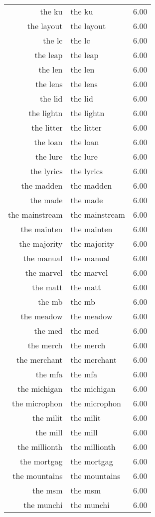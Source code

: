 \begin{table}[ht]
\begin{tabular}{rlr}
  the ku & the ku & 6.00 \\ 
  the layout & the layout & 6.00 \\ 
  the lc & the lc & 6.00 \\ 
  the leap & the leap & 6.00 \\ 
  the len & the len & 6.00 \\ 
  the lens & the lens & 6.00 \\ 
  the lid & the lid & 6.00 \\ 
  the lightn & the lightn & 6.00 \\ 
  the litter & the litter & 6.00 \\ 
  the loan & the loan & 6.00 \\ 
  the lure & the lure & 6.00 \\ 
  the lyrics & the lyrics & 6.00 \\ 
  the madden & the madden & 6.00 \\ 
  the made & the made & 6.00 \\ 
  the mainstream & the mainstream & 6.00 \\ 
  the mainten & the mainten & 6.00 \\ 
  the majority & the majority & 6.00 \\ 
  the manual & the manual & 6.00 \\ 
  the marvel & the marvel & 6.00 \\ 
  the matt & the matt & 6.00 \\ 
  the mb & the mb & 6.00 \\ 
  the meadow & the meadow & 6.00 \\ 
  the med & the med & 6.00 \\ 
  the merch & the merch & 6.00 \\ 
  the merchant & the merchant & 6.00 \\ 
  the mfa & the mfa & 6.00 \\ 
  the michigan & the michigan & 6.00 \\ 
  the microphon & the microphon & 6.00 \\ 
  the milit & the milit & 6.00 \\ 
  the mill & the mill & 6.00 \\ 
  the millionth & the millionth & 6.00 \\ 
  the mortgag & the mortgag & 6.00 \\ 
  the mountains & the mountains & 6.00 \\ 
  the msm & the msm & 6.00 \\ 
  the munchi & the munchi & 6.00 \\ 

\end{tabular}
\end{table}
